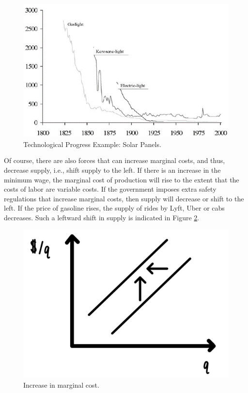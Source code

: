 \documentclass[
]{book}
\begin{document}
\begin{figure}

{\centering \includegraphics[width=0.75\linewidth]{img/supply/fig10} 

}

\caption{Technological Progress Example: Solar Panels.}\label{fig:supply10}
\end{figure}

Of course, there are also forces that can increase marginal costs, and thus, decrease supply, i.e., shift supply to the left. If there is an increase in the minimum wage, the marginal cost of production will rise to the extent that the costs of labor are variable costs. If the government imposes extra safety regulations that increase marginal costs, then supply will decrease or shift to the left. If the price of gasoline rises, the supply of rides by Lyft, Uber or cabs decreases. Such a leftward shift in supply is indicated in Figure \ref{fig:supply11}.

\begin{figure}

{\centering \includegraphics[width=0.75\linewidth]{img/supply/fig11} 

}

\caption{Increase in marginal cost.}\label{fig:supply11}
\end{figure}
\end{document}
